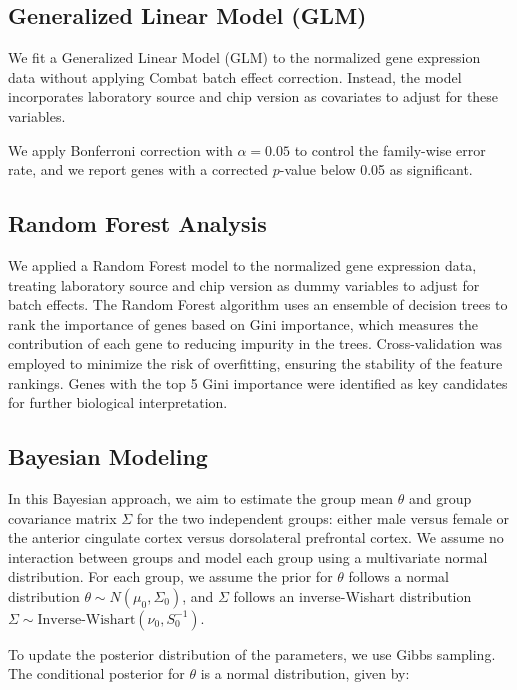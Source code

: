 \documentclass[12pt]{article}
\begin{document}
\subsection{Generalized Linear Model (GLM)}

We fit a Generalized Linear Model (GLM) to the normalized gene expression data without applying Combat batch effect correction. Instead, the model incorporates laboratory source and chip version as covariates to adjust for these variables. 

We apply Bonferroni correction with $\alpha = 0.05$ to control the family-wise error rate, and we report genes with a corrected $p$-value below 0.05 as significant.


\subsection{Random Forest Analysis}

We applied a Random Forest model to the normalized gene expression data, treating laboratory source and chip version as dummy variables to adjust for batch effects. The Random Forest algorithm uses an ensemble of decision trees to rank the importance of genes based on Gini importance, which measures the contribution of each gene to reducing impurity in the trees. Cross-validation was employed to minimize the risk of overfitting, ensuring the stability of the feature rankings. Genes with the top 5 Gini importance were identified as key candidates for further biological interpretation.

\subsection{Bayesian Modeling}

In this Bayesian approach, we aim to estimate the group mean $\theta$ and group covariance matrix $\Sigma$ for the two independent groups: either male versus female or the anterior cingulate cortex versus dorsolateral prefrontal cortex. We assume no interaction between groups and model each group using a multivariate normal distribution. For each group, we assume the prior for $\theta$ follows a normal distribution $\theta \sim N(\mu_0, \Sigma_0)$, and $\Sigma$ follows an inverse-Wishart distribution $\Sigma \sim \text{Inverse-Wishart}(\nu_0, S_0^{-1})$.

To update the posterior distribution of the parameters, we use Gibbs sampling. The conditional posterior for $\theta$ is a normal distribution, given by:
\end{document}
